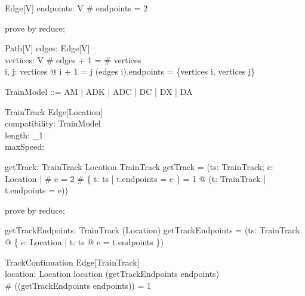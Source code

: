 \begin{schema}{Edge}[V]
  endpoints: \finset  V
\where
  \# endpoints = 2
\end{schema}

\begin{zproof}
prove by reduce;
\end{zproof}

\begin{schema}{Path}[V]
  edges: \iseq  Edge[V]\\
  vertices: \iseq  V
\where
  \# edges + 1 = \# vertices\\
  \forall  i, j: \dom  vertices @ i + 1 = j \implies  (edges i).endpoints = \{vertices i, vertices j\}
\end{schema}


\begin{zed}
TrainModel ::= AM | ADK | ADC | DC | DX | DA
\end{zed}

\begin{schema}{TrainTrack}
  Edge[Location]\\
  compatibility: \finset  TrainModel\\
  length: \nat _1{}\\
  maxSpeed: \nat 
\end{schema}

\begin{axdef}
  getTrack: \finset  TrainTrack \cross  \finset  Location \pfun  TrainTrack
\where
  getTrack = (\lambda  ts: \finset  TrainTrack; e: \finset  Location | \# e = 2 \land  \# \{  t: ts | t.endpoints = e \} = 1 @ (\mu  t: TrainTrack | t.endpoints = e))
\end{axdef}

\begin{zproof}
prove by reduce;
\end{zproof}

\begin{axdef}
  getTrackEndpoints: \finset  TrainTrack \fun  \finset  (\finset  Location)
\where
  getTrackEndpoints = (\lambda  ts: \finset  TrainTrack @ \{  e: \finset  Location | \exists  t: ts @ e = t.endpoints \})
\end{axdef}

\begin{schema}{TrackContinuation}
  Edge[TrainTrack]\\
  location: Location
\where
  location \in  \bigcap  (getTrackEndpoints endpoints)\\
  \# (\bigcap  (getTrackEndpoints endpoints)) = 1
\end{schema}

